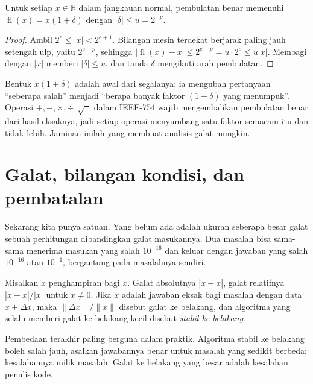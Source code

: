 \begin{teorema}
Untuk setiap $x\in\mathbb{R}$ dalam jangkauan normal, pembulatan benar memenuhi
$\operatorname{fl}(x)=x(1+\delta)$ dengan $|\delta|\le u=2^{-p}$.
\end{teorema}

\begin{proof}
Ambil $2^{e}\le|x|<2^{e+1}$. Bilangan mesin terdekat berjarak paling jauh setengah
ulp, yaitu $2^{e-p}$, sehingga
$|\operatorname{fl}(x)-x|\le2^{e-p}=u\cdot2^{e}\le u|x|$. Membagi dengan $|x|$
memberi $|\delta|\le u$, dan tanda $\delta$ mengikuti arah pembulatan.
\end{proof}

Bentuk $x(1+\delta)$ adalah awal dari segalanya: ia mengubah pertanyaan ``seberapa
salah'' menjadi ``berapa banyak faktor $(1+\delta)$ yang menumpuk''. Operasi
$+,-,\times,\div,\sqrt{\phantom{x}}$ dalam IEEE-754 wajib mengembalikan pembulatan
benar dari hasil eksaknya, jadi setiap operasi menyumbang satu faktor
semacam itu dan tidak lebih. Jaminan inilah yang membuat analisis galat mungkin.


\section{Galat, bilangan kondisi, dan pembatalan}

Sekarang kita punya satuan. Yang belum ada adalah ukuran seberapa besar galat sebuah
perhitungan dibandingkan galat masukannya. Dua masalah bisa sama-sama menerima
masukan yang salah $10^{-16}$ dan keluar dengan jawaban yang salah $10^{-16}$ atau
$10^{-1}$, bergantung pada masalahnya sendiri.


\begin{definisi}
Misalkan $\tilde{x}$ penghampiran bagi $x$. Galat absolutnya $|\tilde{x}-x|$, galat
relatifnya $|\tilde{x}-x|/|x|$ untuk $x\neq0$. Jika $\tilde{x}$ adalah jawaban eksak
bagi masalah dengan data $x+\Delta x$, maka $\|\Delta x\|/\|x\|$ disebut galat ke
belakang, dan algoritma yang selalu memberi galat ke belakang kecil disebut
\emph{stabil ke belakang}.
\end{definisi}

Pembedaan terakhir paling berguna dalam praktik. Algoritma stabil ke belakang boleh
salah jauh, asalkan jawabannya benar untuk masalah yang sedikit berbeda:
kesalahannya milik masalah. Galat ke belakang yang besar adalah kesalahan penulis
kode.

